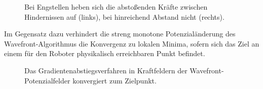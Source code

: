 \begin{figure}[H]
\begin{minipage}{0.46\textwidth}
		\centerline{}
	\end{minipage}
	\hspace*{\fill}
	\label{fig:oscillation}
	\caption{Bei Engstellen heben sich die abstoßenden Kräfte zwischen Hindernissen auf (links), bei hinreichend Abstand nicht (rechts).}
\end{figure}

Im Gegensatz dazu verhindert die streng monotone Potenzialänderung des Wavefront-Algorithmus die Konvergenz zu lokalen Minima, sofern sich das Ziel an einem für den Roboter physikalisch erreichbaren Punkt befindet.
\begin{figure}[H]
	\footnotesize
	\centering
	\centerline{}
	\caption{Das Gradientenabstiegsverfahren in Kraftfeldern der Wavefront-Potenzialfelder konvergiert zum Zielpunkt.}
\end{figure}

